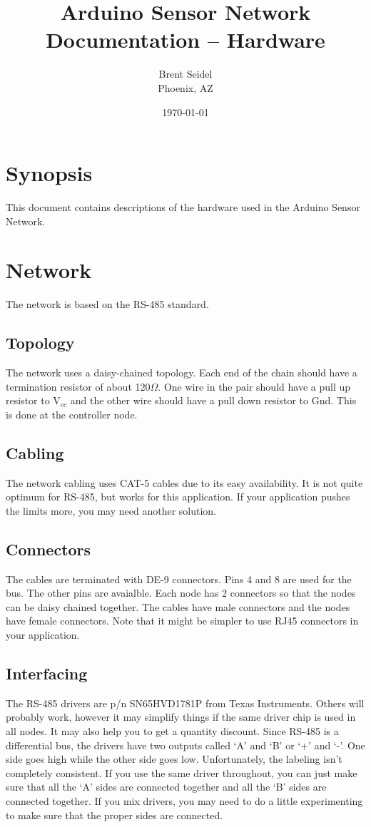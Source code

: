 \documentclass[10pt, openany, draft]{article}
\title{Arduino Sensor Network Documentation -- Hardware}
\author{Brent Seidel \\ Phoenix, AZ}
\date{ \today }
\begin{document}
\maketitle

\section{Synopsis}
This document contains descriptions of the hardware used in the Arduino Sensor Network.

\section{Network}
The network is based on the RS-485 standard.

\subsection{Topology}
The network uses a daisy-chained topology.  Each end of the chain should have a termination resistor of about 120$\Omega$.  One wire in the pair should have a pull up resistor to V$_{cc}$ and the other wire should have a pull down resistor to Gnd.  This is done at the controller node.

\subsection{Cabling}
The network cabling uses CAT-5 cables due to its easy availability.  It is not quite optimum for RS-485, but works for this application.  If your application pushes the limits more, you may need another solution.

\subsection{Connectors}
The cables are terminated with DE-9 connectors.  Pins 4 and 8 are used for the bus.  The other pins are avaialble.  Each node has 2 connectors so that the nodes can be daisy chained together.  The cables have male connectors and the nodes have female connectors.  Note that it might be simpler to use RJ45 connectors in your application.

\subsection{Interfacing}
The RS-485 drivers are p/n SN65HVD1781P from Texas Instruments.  Others will probably work, however it may simplify things if the same driver chip is used in all nodes.  It may also help you to get a quantity discount.  Since RS-485 is a differential bus, the drivers have two outputs called `A' and `B' or `+' and `-'.  One side goes high while the other side goes low.  Unfortunately, the labeling isn't completely consistent.  If you use the same driver throughout, you can just make sure that all the `A' sides are connected together and all the `B' sides are connected together.  If you mix drivers, you may need to do a little experimenting to make sure that the proper sides are connected.
\end{document}
